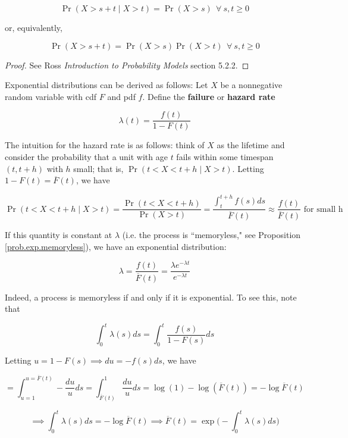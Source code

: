 \begin{itemize}
\begin{proposition}
\[
\Pr(X > s + t \mid X > t) = \Pr(X > s) \ \ \forall \ s, t \geq 0
\]

or, equivalently,

\[
\Pr(X > s + t ) = \Pr(X > s)\Pr(X > t) \ \ \forall \ s, t \geq 0
\]

\end{proposition}

\begin{proof} See Ross \textit{Introduction to Probability Models} section 5.2.2.

\end{proof}

\begin{remark} Exponential distributions can be derived as follows: Let \(X\) be a nonnegative random variable with cdf \(F\) and pdf \(f\). Define the \textbf{failure} or \textbf{hazard rate}

\[
\lambda(t) = \frac{f(t)}{1 - F(t)}
\]

The intuition for the hazard rate is as follows: think of \(X\) as the lifetime and consider the probability that a unit with age \(t\) fails within some timespan \((t, t+h)\) with \(h\) small; that is, \(\Pr(t < X < t+h \mid X > t)\). Letting \(1 - F(t) = \overline{F}(t)\), we have

\[
\Pr(t < X < t+h \mid X > t) = \frac{\Pr(t < X < t + h)}{\Pr(X > t)} =  \frac{\int_t^{t+h}f(s)ds }{\overline{F}(t)} \approx \frac{f(t)}{\overline{F}(t)} \text{ for small h}
\]

If this quantity is constant at \(\lambda\) (i.e. the process is ``memoryless," see Proposition \ref{prob.exp.memoryless}), we have an exponential distribution:

\[
\lambda =  \frac{f(t)}{\overline{F}(t)} = \frac{\lambda e^{-\lambda t}}{e^{-\lambda t}}
\]

Indeed, a process is memoryless if and only if it is exponential. To see this, note that 

\[
\int_0^t \lambda(s) ds = \int_0 ^t \frac{f(s)}{1 - F(s)} ds 
\]

Letting \(u = 1 - F(s) \implies du = - f(s)ds\), we have

\[
=  \int_{u=1}^{u=\overline{F}(t)} - \frac{du}{u} ds  =   \int_{\overline{F}(t)}^{1}  \frac{du}{u} ds = \log(1) - \log(\overline{F}(t)) = - \log \overline{F}(t)
\]

\[
\implies \int_0^t \lambda(s) ds  = - \log \overline{F}(t) \implies \boxed{\overline{F}(t) = \exp \bigg( - \int_0^t \lambda(s) ds \bigg) }
\]


\end{remark}
\end{itemize}
